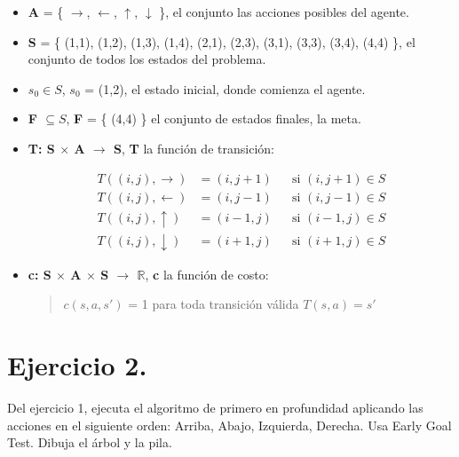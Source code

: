 \documentclass[12pt,letterpaper]{article}
\begin{document}
\begin{itemize}
\item \textbf{A} = \{ $\rightarrow$, $\leftarrow$, $\uparrow$, $\downarrow$ \}, el conjunto las acciones posibles del agente.
  
\item \textbf{S} = \{ (1,1), (1,2), (1,3), (1,4), (2,1), (2,3), (3,1), (3,3), (3,4), (4,4) \}, el conjunto de todos los estados del problema.
  
\item \textbf{$s_0 \in S$}, $s_0$ = (1,2), el estado inicial, donde comienza el agente.
  
\item \textbf{F $\subseteq S$}, \textbf{F} = \{ (4,4) \} el conjunto de estados finales, la meta.
  
\item \textbf{T: S $\times$ A $\rightarrow$ S}, \textbf{T} la función de transición:
  
  \begin{align}
    T((i,j),\rightarrow) &= (i,j+1) && \text{si } (i,j+1)\in S \\
    T((i,j),\leftarrow)  &= (i,j-1) && \text{si } (i,j-1)\in S \\
    T((i,j),\uparrow)    &= (i-1,j) && \text{si } (i-1,j)\in S \\
    T((i,j),\downarrow)  &= (i+1,j) && \text{si } (i+1,j)\in S
  \end{align}
  
\item \textbf{c: S $\times$ A $\times$ S $\rightarrow$ $\mathbb{R}$}, \textbf{c} la función de costo:
  \begin{quote}
    $c(s, a, s')$ = 1 \; para toda transición válida $T(s, a) = s'$
  \end{quote}
\end{itemize}


\newpage


\section{Ejercicio 2.}
Del ejercicio 1, ejecuta el algoritmo de primero en profundidad aplicando las acciones en el siguiente orden: Arriba, Abajo, Izquierda, Derecha. Usa Early Goal Test. Dibuja el árbol y la pila.

\bigskip


\end{document}
